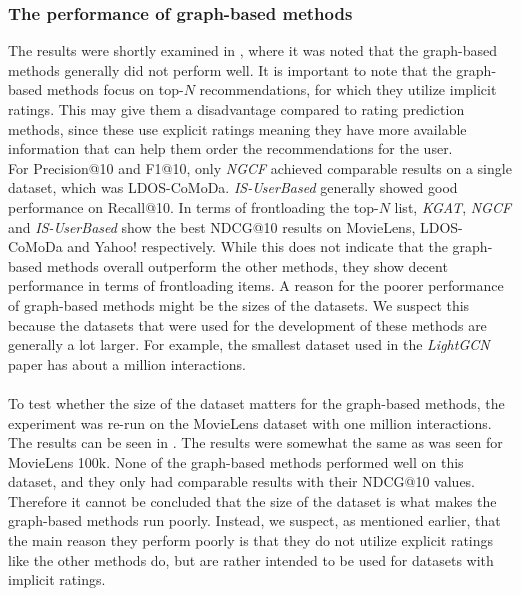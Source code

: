 \subsubsection{The performance of graph-based methods} 
The results were shortly examined in , where it was noted that the graph-based methods generally did not perform well.
It is important to note that the graph-based methods focus on top-$N$ recommendations, for which they utilize implicit ratings.
This may give them a disadvantage compared to rating prediction methods, since these use explicit ratings meaning they have more available information that can help them order the recommendations for the user.
\\
For Precision@10 and F1@10, only \textit{NGCF} achieved comparable results on a single dataset, which was LDOS-CoMoDa.
\textit{IS-UserBased} generally showed good performance on Recall@10.
In terms of frontloading the top-$N$ list, \textit{KGAT}, \textit{NGCF} and \textit{IS-UserBased} show the best NDCG@10 results on MovieLens, LDOS-CoMoDa and Yahoo! respectively.
While this does not indicate that the graph-based methods overall outperform the other methods, they show decent performance in terms of frontloading items.
A reason for the poorer performance of graph-based methods might be the sizes of the datasets.
We suspect this because the datasets that were used for the development of these methods are generally a lot larger.
For example, the smallest dataset used in the \textit{LightGCN}\cite{LightGCN} paper has about a million interactions.
\\\\
To test whether the size of the dataset matters for the graph-based methods, the experiment was re-run on the MovieLens dataset with one million interactions.
The results can be seen in .
The results were somewhat the same as was seen for MovieLens 100k.
None of the graph-based methods performed well on this dataset, and they only had comparable results with their NDCG@10 values.
Therefore it cannot be concluded that the size of the dataset is what makes the graph-based methods run poorly. 
Instead, we suspect, as mentioned earlier, that the main reason they perform poorly is that they do not utilize explicit ratings like the other methods do, but are rather intended to be used for datasets with implicit ratings.
